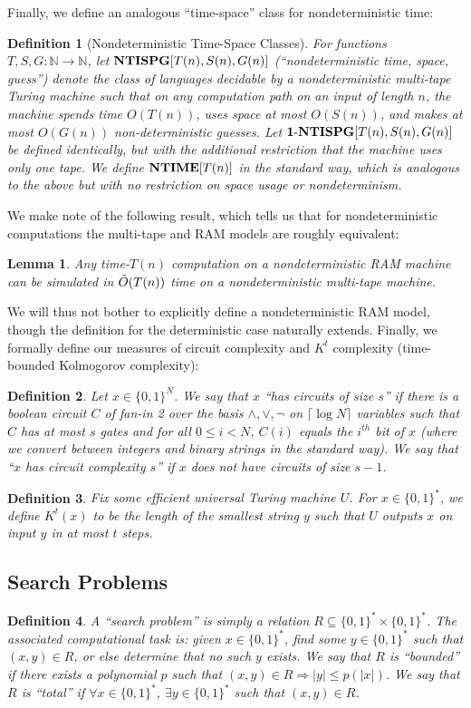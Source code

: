 \documentclass[11pt]{article}
\newtheorem{lemma}{Lemma}
\newtheorem{definition}{Definition}
\newcommand{\dash}{\text{-}}
\newcommand{\B}{\{0,1\}}
\def\cl{\bf}
\begin{document}
Finally, we define an analogous ``time-space'' class for nondeterministic time:
\begin{definition}[Nondeterministic Time-Space Classes]
\sloppy For functions $T,S,G\colon\mathbb{N} \rightarrow \mathbb{N}$, let ${\cl NTISPG}[T(n),S(n),G(n)]$ (``nondeterministic time, space, guess'')  denote the class of languages decidable by a nondeterministic multi-tape Turing machine such that on any computation path on an input of length $n$, the machine spends time $O(T(n))$, uses space at most $O(S(n))$, and makes at most $O(G(n))$ non-deterministic guesses. Let ${\cl 1\dash NTISPG}[T(n),S(n),G(n)]$ be defined identically, but with the additional restriction that the machine uses only one tape. We define ${\cl NTIME}[T(n)]$ in the standard way, which is analogous to the above but with no restriction on space usage or nondeterminism.
\end{definition}
We make note of the following result, which tells us that for nondeterministic computations the multi-tape and RAM models are roughly equivalent:
\begin{lemma}\label{lem:ram-tape-same}\cite{NLT}
Any time-$T(n)$ computation on a nondeterministic RAM machine can be simulated in $\Tilde{O}(T(n))$ time on a nondeterministic multi-tape machine.
\end{lemma}
We will thus not bother to explicitly define a nondeterministic RAM model, though the definition for the deterministic case naturally extends. Finally, we formally define our measures of circuit complexity and $K^t$ complexity (time-bounded Kolmogorov complexity):
\begin{definition}
Let $x \in \B^N$. We say that $x$ ``has circuits of size $s$'' if there is a boolean circuit $C$ of fan-in 2 over the basis $\land,\lor,\lnot$ on $\lceil \log N \rceil$ variables such that $C$ has at most $s$ gates and for all $0 \leq i < N$, $C(i)$ equals the $i^{th}$ bit of $x$ (where we convert between integers and binary strings in the standard way). We say that ``$x$ has circuit complexity $s$'' if $x$ does not have circuits of size $s-1$.
\end{definition}
\begin{definition}
Fix some efficient universal Turing machine $U$. For $x \in \B^*$, we define $K^t(x)$ to be the length of the smallest string $y$ such that $U$ outputs $x$ on input $y$ in at most $t$ steps.
\end{definition}
\subsection{Search Problems}\label{subsec:search-problems}
\begin{definition}
A ``search problem'' is simply a relation $R \subseteq \B^* \times \B^*$. The associated computational task is: given $x \in \B^*$, find some $y \in \B^*$ such that $(x,y) \in R$, or else determine that no such $y$ exists. We say that $R$ is ``bounded'' if there exists a polynomial $p$ such that $(x,y) \in R \Rightarrow |y| \leq p(|x|)$. We say that $R$ is ``total'' if $\forall x \in \B^*$, $\exists y \in \B^*$ such that $(x,y) \in R$.
\end{definition}
\end{document}
